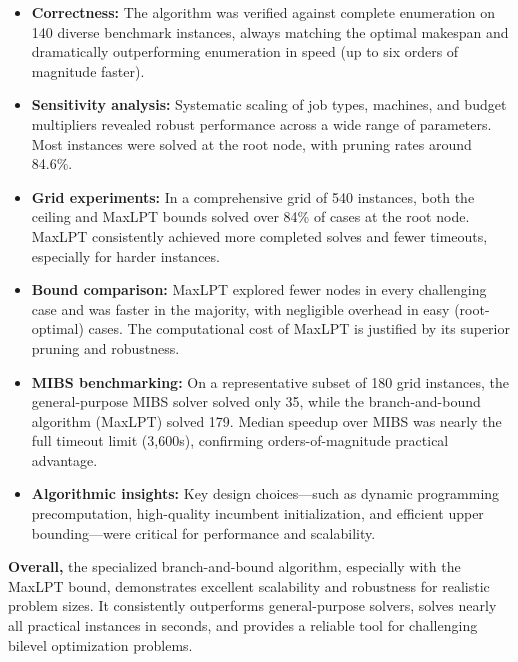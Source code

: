 \begin{itemize}
    \item \textbf{Correctness:} The algorithm was verified against complete enumeration on 140 diverse benchmark instances, always matching the optimal makespan and dramatically outperforming enumeration in speed (up to six orders of magnitude faster).
    \item \textbf{Sensitivity analysis:} Systematic scaling of job types, machines, and budget multipliers revealed robust performance across a wide range of parameters. Most instances were solved at the root node, with pruning rates around 84.6\%.
    \item \textbf{Grid experiments:} In a comprehensive grid of 540 instances, both the ceiling and MaxLPT bounds solved over 84\% of cases at the root node. MaxLPT consistently achieved more completed solves and fewer timeouts, especially for harder instances.
    \item \textbf{Bound comparison:} MaxLPT explored fewer nodes in every challenging case and was faster in the majority, with negligible overhead in easy (root-optimal) cases. The computational cost of MaxLPT is justified by its superior pruning and robustness.
    \item \textbf{MIBS benchmarking:} On a representative subset of 180 grid instances, the general-purpose MIBS solver solved only 35, while the branch-and-bound algorithm (MaxLPT) solved 179. Median speedup over MIBS was nearly the full timeout limit (3,600s), confirming orders-of-magnitude practical advantage.    
    \item \textbf{Algorithmic insights:} Key design choices—such as dynamic programming precomputation, high-quality incumbent initialization, and efficient upper bounding—were critical for performance and scalability.
\end{itemize}

\textbf{Overall,} the specialized branch-and-bound algorithm, especially with the MaxLPT bound, demonstrates excellent scalability and robustness for realistic problem sizes. It consistently outperforms general-purpose solvers, solves nearly all practical instances in seconds, and provides a reliable tool for challenging bilevel optimization problems.

